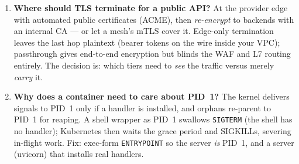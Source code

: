 \begin{enumerate}[label=\textbf{Q\arabic*.}, leftmargin=1.6cm, start=11]
        gateway is the product tier at the platform edge: auth offload,
        rate limiting, transformation, analytics --- the policy
        enforcement point for north-south traffic. A mesh puts proxies on
        every workload to govern \emph{east-west}: mTLS, retries,
        telemetry between services. Production commonly runs all three in
        sequence; the failure mode is enforcing one concern in two tiers
        with different budgets.
  \item \textbf{Where should TLS terminate for a public API?}
        At the provider edge with automated public certificates (ACME),
        then \emph{re-encrypt} to backends with an internal CA --- or let
        a mesh's mTLS cover it. Edge-only termination leaves the last hop
        plaintext (bearer tokens on the wire inside your VPC);
        passthrough gives end-to-end encryption but blinds the WAF and
        L7 routing entirely. The decision is: which tiers need to
        \emph{see} the traffic versus merely \emph{carry} it.
  \item \textbf{Why does a container need to care about PID~1?}
        The kernel delivers signals to PID~1 only if a handler is
        installed, and orphans re-parent to PID~1 for reaping. A shell
        wrapper as PID~1 swallows \texttt{SIGTERM} (the shell has no
        handler); Kubernetes then waits the grace period and SIGKILLs,
        severing in-flight work. Fix: exec-form \texttt{ENTRYPOINT} so
        the server \emph{is} PID~1, and a server (uvicorn) that installs
        real handlers.
\end{enumerate}

